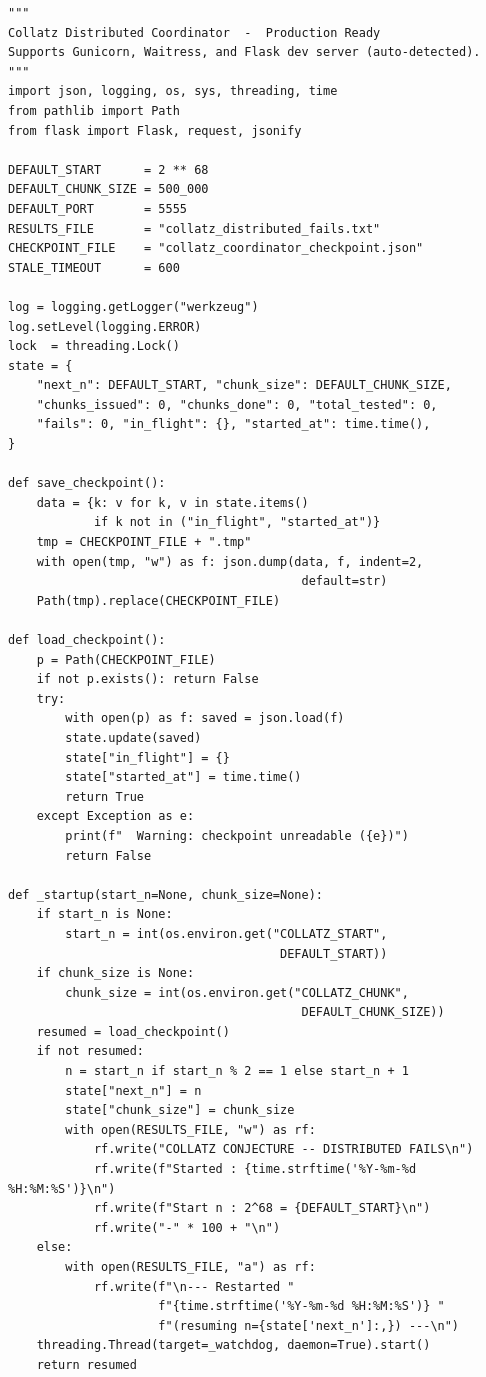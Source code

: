 \documentclass{mcom-l}
\theoremstyle{definition}
\theoremstyle{remark}
\numberwithin{equation}{section}
\begin{document}
\begin{lstlisting}[caption={Coordinator: chunk dispatch, checkpointing,
                             and results collection.},
                   label={lst:coordinator}]
"""
Collatz Distributed Coordinator  -  Production Ready
Supports Gunicorn, Waitress, and Flask dev server (auto-detected).
"""
import json, logging, os, sys, threading, time
from pathlib import Path
from flask import Flask, request, jsonify

DEFAULT_START      = 2 ** 68
DEFAULT_CHUNK_SIZE = 500_000
DEFAULT_PORT       = 5555
RESULTS_FILE       = "collatz_distributed_fails.txt"
CHECKPOINT_FILE    = "collatz_coordinator_checkpoint.json"
STALE_TIMEOUT      = 600

log = logging.getLogger("werkzeug")
log.setLevel(logging.ERROR)
lock  = threading.Lock()
state = {
    "next_n": DEFAULT_START, "chunk_size": DEFAULT_CHUNK_SIZE,
    "chunks_issued": 0, "chunks_done": 0, "total_tested": 0,
    "fails": 0, "in_flight": {}, "started_at": time.time(),
}

def save_checkpoint():
    data = {k: v for k, v in state.items()
            if k not in ("in_flight", "started_at")}
    tmp = CHECKPOINT_FILE + ".tmp"
    with open(tmp, "w") as f: json.dump(data, f, indent=2,
                                         default=str)
    Path(tmp).replace(CHECKPOINT_FILE)

def load_checkpoint():
    p = Path(CHECKPOINT_FILE)
    if not p.exists(): return False
    try:
        with open(p) as f: saved = json.load(f)
        state.update(saved)
        state["in_flight"] = {}
        state["started_at"] = time.time()
        return True
    except Exception as e:
        print(f"  Warning: checkpoint unreadable ({e})")
        return False

def _startup(start_n=None, chunk_size=None):
    if start_n is None:
        start_n = int(os.environ.get("COLLATZ_START",
                                      DEFAULT_START))
    if chunk_size is None:
        chunk_size = int(os.environ.get("COLLATZ_CHUNK",
                                         DEFAULT_CHUNK_SIZE))
    resumed = load_checkpoint()
    if not resumed:
        n = start_n if start_n % 2 == 1 else start_n + 1
        state["next_n"] = n
        state["chunk_size"] = chunk_size
        with open(RESULTS_FILE, "w") as rf:
            rf.write("COLLATZ CONJECTURE -- DISTRIBUTED FAILS\n")
            rf.write(f"Started : {time.strftime('%Y-%m-%d %H:%M:%S')}\n")
            rf.write(f"Start n : 2^68 = {DEFAULT_START}\n")
            rf.write("-" * 100 + "\n")
    else:
        with open(RESULTS_FILE, "a") as rf:
            rf.write(f"\n--- Restarted "
                     f"{time.strftime('%Y-%m-%d %H:%M:%S')} "
                     f"(resuming n={state['next_n']:,}) ---\n")
    threading.Thread(target=_watchdog, daemon=True).start()
    return resumed


\end{lstlisting}
\end{document}
